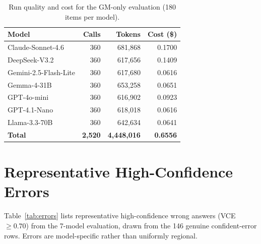 \documentclass[11pt]{article}
\begin{document}
\begin{table}[t]
\centering
\small
\setlength{\tabcolsep}{2.5pt}
\begin{tabularx}{\columnwidth}{@{}Xrrr@{}}
\toprule
\textbf{Model} & \textbf{Calls} & \textbf{Tokens} & \textbf{Cost (\$)} \\
\midrule
Claude-Sonnet-4.6 & 360 & 681,868 & 0.1700 \\
DeepSeek-V3.2 & 360 & 617,656 & 0.1409 \\
Gemini-2.5-Flash-Lite & 360 & 617,680 & 0.0616 \\
Gemma-4-31B & 360 & 653,258 & 0.0651 \\
GPT-4o-mini & 360 & 616,902 & 0.0923 \\
GPT-4.1-Nano & 360 & 618,018 & 0.0616 \\
Llama-3.3-70B & 360 & 642,634 & 0.0641 \\
\midrule
\textbf{Total} & \textbf{2,520} & \textbf{4,448,016} & \textbf{0.6556} \\
\bottomrule
\end{tabularx}
\caption{Run quality and cost for the GM-only evaluation (180 items per model).}
\label{tab:runquality}
\end{table}

\section{Representative High-Confidence Errors}
\label{app:errors}

Table~\ref{tab:errors} lists representative high-confidence wrong answers (VCE $\geq 0.70$) from the 7-model evaluation, drawn from the 146 genuine confident-error rows. Errors are model-specific rather than uniformly regional.
\end{document}
